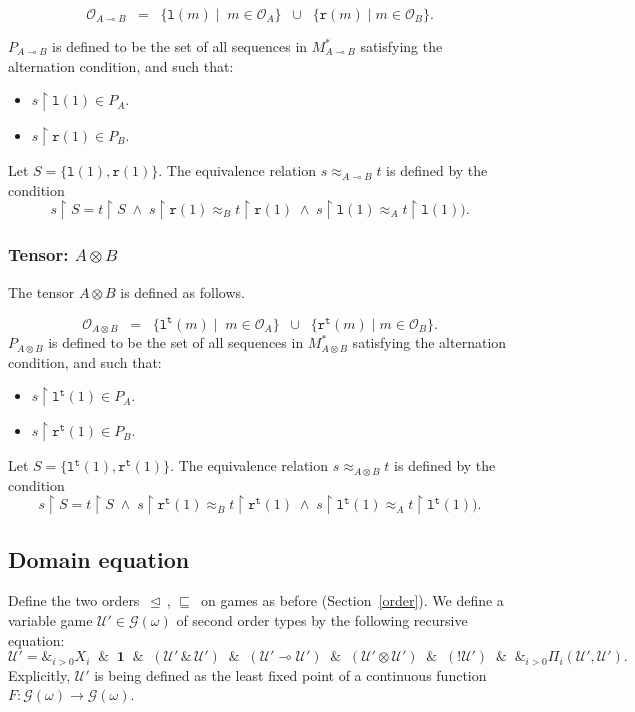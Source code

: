 \documentclass[a4paper,11pt]{article}
\newcommand{\gequiv}{\approx}
\newcommand{\GG}[1]{\mathcal{G}(#1)}
\newcommand{\restrict}{{\upharpoonright}}
\newcommand{\llwith}{\, \& \,}
\newcommand{\domapprox}{\, \sqsubseteq \,}
\newcommand{\ginc}{\, \trianglelefteq \,}
\newcommand{\Occ}{\mathcal{O}}
\newcommand{\fr}{\mathtt{r}}
\newcommand{\linearfl}{\mathtt{l}}
\newcommand{\tensorfl}{\mathtt{l^t}}
\newcommand{\tensorfr}{\mathtt{r^t}}
\newcommand{\tensor}{\otimes}
\newcommand{\linimpl}{\multimap}
\newcommand{\LUU}{\mathcal{U'}}
\begin{document}
\[ \Occ_{A \multimap B} \;\; = \;\; \{ \linearfl(m) \mid \; m \in
\Occ_A \} \;\; \cup \;\; \{ \fr (m) \mid m \in
\Occ_B \} .  \]

\noindent $P_{A \linimpl B}$ is defined to be the set of all
sequences in $M_{A \linimpl B}^{\ast}$ satisfying the alternation
condition, and such that:
\begin{itemize}
\item $s \restrict \linearfl (1) \in P_A$.
\item $s \restrict \fr (1) \in P_B$.
\end{itemize}
Let $S = \{\linearfl (1) , \fr (1) \}$. The equivalence relation $s \gequiv_{A \linimpl  B} t$ is defined
by the condition
\[ s \restrict S = t \restrict S \; \wedge \; s \restrict \fr (1) \gequiv_B t \restrict \fr (1) \; \wedge \;
s \restrict \linearfl (1) \gequiv_A t \restrict \linearfl(1) ) .
\]
\subsubsection*{Tensor: $A \tensor B$}
The tensor $A \tensor B$ is defined as follows.

\[ \Occ_{A \tensor B} \;\; = \;\; \{ \tensorfl(m) \mid \; m \in
\Occ_A \} \;\; \cup \;\; \{ \tensorfr (m) \mid m \in \Occ_B \} .
\]
 \noindent $P_{A \tensor B}$ is defined to be the
set of all sequences in $M_{A \tensor B}^{\ast}$ satisfying the
alternation condition, and such that:
\begin{itemize}
\item $s \restrict \tensorfl (1) \in P_A$.
\item $s \restrict \tensorfr (1) \in P_B$.
\end{itemize}
Let $S = \{\tensorfl (1) , \tensorfr (1) \}$. The equivalence relation $s \gequiv_{A \tensor B} t$ is defined by
the condition
\[ s \restrict S = t \restrict S \; \wedge \; s \restrict \tensorfr (1) \gequiv_B t \restrict \tensorfr (1) \; \wedge \;
s \restrict \tensorfl (1) \gequiv_A t \restrict \tensorfl(1) ) .
\]

\subsection{Domain equation}
Define the two orders $\ginc, \domapprox$ on games as before
(Section~\ref{order}).   We define a variable game $\LUU \in
\GG{\omega}$ of second order types by the following recursive
equation:
\[ \LUU =  \&_{i>0} X_i \;\; \& \;\; \mathbf{1} \;\; \& \;\; (\LUU
\llwith \LUU ) \;\; \& \;\; (\LUU \linimpl \LUU ) \;\; \& \;\; (\LUU
\tensor \LUU ) \;\; \& \;\; (!\LUU ) \;\; \& \;\; \&_{i>0}
\Pi_{i} (\LUU , \LUU ) . \]
Explicitly, $\LUU$ is being defined as
the least fixed point of a continuous function $F : \GG{\omega}
\longrightarrow \GG{\omega}$.
\end{document}
